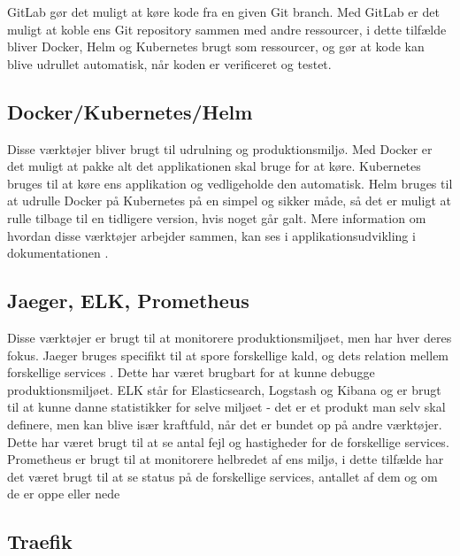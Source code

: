 GitLab \cite[Gitlan]{converge-terms} gør det muligt at køre kode fra en given Git branch. Med GitLab er det muligt at koble ens Git repository sammen med andre ressourcer, i dette tilfælde bliver Docker, Helm og Kubernetes \cite[Udrulning og produktionsmiljø]{converge-terms} brugt som ressourcer, og gør at kode kan blive udrullet automatisk, når koden er verificeret og testet.


\subsection{Docker/Kubernetes/Helm}

Disse værktøjer bliver brugt til udrulning og produktionsmiljø. Med Docker er det muligt at pakke alt det applikationen skal bruge for at køre. Kubernetes bruges til at køre ens applikation og vedligeholde den automatisk. Helm bruges til at udrulle Docker på Kubernetes på en simpel og sikker måde, så det er muligt at rulle tilbage til en tidligere version, hvis noget går galt. Mere information om hvordan disse værktøjer arbejder sammen, kan ses i applikationsudvikling i dokumentationen \cite{application-development-dokumentation}.

\subsection{Jaeger, ELK, Prometheus}

Disse værktøjer er brugt til at monitorere produktionsmiljøet, men har hver deres fokus. Jaeger \cite[Jaeger]{converge-terms} bruges specifikt til at spore forskellige kald, og dets relation mellem forskellige services \cite[Services]{converge-terms}. Dette har været brugbart for at kunne debugge produktionsmiljøet. ELK \cite[ELK]{converge-terms} står for Elasticsearch, Logstash og Kibana og er brugt til at kunne danne statistikker for selve miljøet - det er et produkt man selv skal definere, men kan blive især kraftfuld, når det er bundet op på andre værktøjer. Dette har været brugt til at se antal fejl og hastigheder for de forskellige services. Prometheus \cite[Prometheus]{converge-terms} er brugt til at monitorere helbredet af ens miljø, i dette tilfælde har det været brugt til at se status på de forskellige services, antallet af dem og om de er oppe eller nede

\subsection{Traefik}

